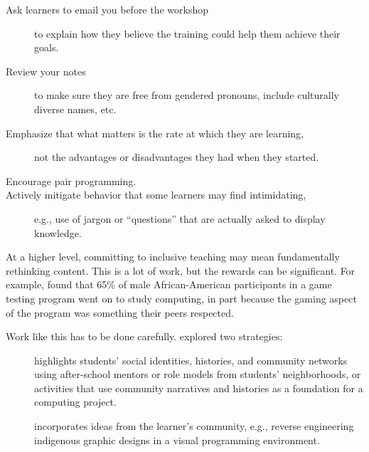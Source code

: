 \begin{description}

\item[Ask learners to email you before the workshop] to explain how
  they believe the training could help them achieve their goals.

\item[Review your notes] to make sure they are free from gendered
  pronouns, include culturally diverse names, etc.

\item[Emphasize that what matters is the rate at which they are
  learning,] not the advantages or disadvantages they had when they
  started.

\item[Encourage pair programming.]

\item[Actively mitigate behavior that some learners may find
  intimidating,] e.g., use of jargon or ``questions'' that are
  actually asked to display knowledge.

\end{description}

At a higher level, committing to inclusive teaching may mean
fundamentally rethinking content.  This is a lot of work, but the
rewards can be significant.  For example, \cite{DiSa2014a} found that
65\% of male African-American participants in a game testing program
went on to study computing, in part because the gaming aspect of the
program was something their peers respected.

Work like this has to be done carefully.  \cite{Lach2018} explored two
strategies:

\begin{description}

\item[]
  highlights students' social identities, histories, and community
  networks using after-school mentors or role models from students'
  neighborhoods, or activities that use community narratives and
  histories as a foundation for a computing project.

\item[] incorporates ideas from the learner's community,
  e.g., reverse engineering indigenous graphic designs in a visual
  programming environment.

\end{description}

